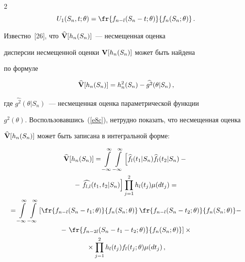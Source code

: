 \begin{multicols}{2}
\begin{equation}
U_1(S_n,t;\theta)=\fr{f_{n-l}(S_n-t;\theta)}{f_n(S_n;\theta)}\,.


\label{e7c}


\end{equation}


  Известно~[26], что $\widehat{\bf {V}}[h_n(S_n)]$~--- несмещенная оценка


  дисперсии несмещенной оценки ${\bf V}[h_n(S_n)]$ может быть найдена


  по формуле


  \begin{equation}


 \widehat{\bf {V}}[h_n(S_n)]=h_n^2(S_n)-\widehat{g^2}(\theta|S_n)\,,


\label{e8c}


\end{equation}


 где $\widehat{g^2}(\theta|S_n)$~--- несмещенная оценка параметрической функции


  $g^2(\theta)$. Воспользовавшись~(\ref{e8c}), нетрудно показать, что несмещенная оценка


  $\widehat{\bf {V}}[h_n(S_n)]$ может быть записана в интегральной форме:


  \begin{multline}


 \widehat{\bf {V}}[h_n(S_n)]=


     \intd \left[ \widehat{f_l}(t_1|S_n) \widehat{f_l}(t_2|S_n)-{}\right.\\


     {}-\left.


      \widehat{f_{l,l}}(t_1,t_2|S_n) \right]


      \prod_{j=1}^2 h_l(t_j) \mu(dt_j)={}\\


{}=


  \intd \left[ \fr{f_{n-l}(S_n-t_1;\theta)}{f_n(S_n;\theta)}


       \, \fr{f_{n-l}(S_n-t_2;\theta)}{f_n(S_n;\theta)}-\right.{}\\


       {}-\left.


       \fr{f_{n-2l}(S_n-t_1-t_2;\theta)}{f_n(S_n;\theta)}\right]\times{}\\


{}\times


   \prod_{j=1}^2 h_l(t_j) f_l(t_j;\theta) \mu(dt_j)\,, 


\label{e9c}


\end{multline}



\end{multicols}
